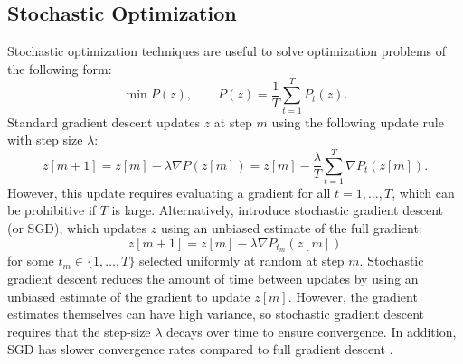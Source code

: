 \subsection{Stochastic Optimization}

Stochastic optimization techniques are useful to solve optimization problems of the following form:
%
\begin{equation*}
    \min P(z), \qquad P(z) = \frac{1}{T}\sum_{t = 1}^T P_t(z).
\end{equation*}
%
Standard gradient descent updates $z$ at step $m$ using the following update rule with step size $\lambda$:
%
\begin{equation*}
    z[m+1] = z[m] - \lambda \nabla P(z[m]) =  z[m] - \frac{\lambda}{T} \sum_{t=1}^T \nabla P_t(z[m]).
\end{equation*}
%
However, this update requires evaluating a gradient for all $t = 1,\ldots,T$, which can be prohibitive if $T$ is large. Alternatively, \citet{Robbins:1951} introduce stochastic gradient descent (or SGD), which updates $z$ using an unbiased estimate of the full gradient:
%
\begin{equation*}
    z[m+1] = z[m] - \lambda \nabla P_{t_m}(z[m])
\end{equation*}
%
for some $t_m \in \{1,\ldots,T\}$ selected uniformly at random at step $m$. Stochastic gradient descent reduces the amount of time between updates by using an unbiased estimate of the gradient to update $z[m]$. However, the gradient estimates themselves can have high variance, so stochastic gradient descent requires that the step-size $\lambda$ decays over time to ensure convergence. In addition, SGD has slower convergence rates compared to full gradient descent \citep{Schmidt:2017}.

